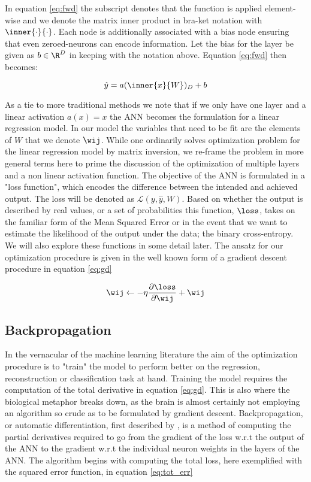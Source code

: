 \noindent In equation \ref{eq:fwd} the subscript denotes that the function is applied element-wise and we denote the matrix inner product in bra-ket notation with $\inner{\cdot}{\cdot}$. Each node is additionally associated with a bias node ensuring that even zeroed-neurons can encode information. Let the bias for the layer be given as $b \in \R^D$ in keeping with the notation above. Equation \ref{eq:fwd} then becomes:

\begin{equation}\label{eq:fwd_b}
	\hat{y} = a(\inner{x}{W})_D + b
\end{equation}

\noindent As a tie to more traditional methods we note that if we only have one layer and a linear activation $a(x) = x$ the ANN becomes the formulation for a linear regression model. In our model the variables that need to be fit are the elements of $W$ that we denote $\wij$. While one ordinarily solves optimization problem for the linear regression model by matrix inversion, we re-frame the problem in more general terms here to prime the discussion of the optimization of multiple layers and a non linear activation function. The objective of the ANN is formulated in a "loss function", which encodes the difference between the intended and achieved output. The loss will be denoted as $\mathcal{L}(y, \hat{y}, W)$. Based on whether the output is described by real values, or a set of probabilities this function, $\loss$, takes on the familiar form of the Mean Squared Error or in the event that we want to estimate the likelihood of the output under the data; the binary cross-entropy. We will also explore these functions in some detail later. The ansatz for our optimization procedure is given in the well known form of a gradient descent procedure in equation \ref{eq:gd}

\begin{equation}\label{eq:gd}
	\wij \leftarrow -\eta \frac{\partial \loss}{\partial \wij} + \wij 
\end{equation}

\subsection{Backpropagation}\label{sec:backpropagation}

In the vernacular of the machine learning literature the aim of the optimization procedure is to "train" the model to perform better on the regression, reconstruction or classification task at hand. Training the model requires the computation of the total derivative in equation \ref{eq:gd}. This is also where the biological metaphor breaks down, as the brain is almost certainly not employing an algorithm so crude as to be formulated by gradient descent. Backpropagation, or automatic differentiation, first described by \citet{Linnainmaa1976}, is a method of computing the partial derivatives required to go from the gradient of the loss w.r.t the output of the ANN to the gradient w.r.t the individual neuron weights in the layers of the ANN. The algorithm begins with computing the total loss, here exemplified with the squared error function, in equation \ref{eq:tot_err}

